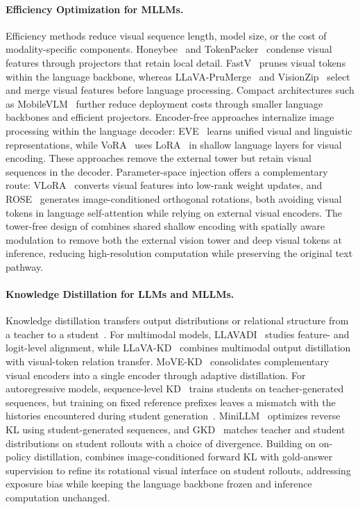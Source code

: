 \paragraph{Efficiency Optimization for MLLMs.}
Efficiency methods reduce visual sequence length, model size, or the cost
of modality-specific components. Honeybee~\citep{cha2024honeybee} and
TokenPacker~\citep{li2025tokenpacker} condense visual features through
projectors that retain local detail. FastV~\citep{chen2024fastv} prunes
visual tokens within the language backbone, whereas
LLaVA-PruMerge~\citep{shang2025prumerge} and
VisionZip~\citep{yang2025visionzip} select and merge visual features before
language processing. Compact architectures such as
MobileVLM~\citep{chu2023mobilevlm} further reduce deployment costs through
smaller language backbones and efficient projectors. Encoder-free
approaches internalize image processing within the language decoder:
EVE~\citep{diao2024eve} learns unified visual and linguistic
representations, while VoRA~\citep{vora2025} uses
LoRA~\citep{hu2021lora} in shallow language layers for visual encoding.
These approaches remove the external tower but retain visual sequences
in the decoder. Parameter-space injection offers a complementary route:
VLoRA~\citep{ma2024vlora} converts visual features into low-rank weight
updates, and ROSE~\citep{rose2025} generates image-conditioned orthogonal
rotations, both avoiding visual tokens in language self-attention while
relying on external visual encoders.
The tower-free design of \modelname{} combines shared shallow encoding
with spatially aware modulation to remove both the external vision tower and deep visual
tokens at inference, reducing high-resolution computation while
preserving the original text pathway.

\paragraph{Knowledge Distillation for LLMs and MLLMs.}
Knowledge distillation transfers output distributions or relational
structure from a teacher to a student~\citep{hinton2015distilling,park2019rkd}.
For multimodal models, LLAVADI~\citep{xu2024llavadi} studies feature- and
logit-level alignment, while LLaVA-KD~\citep{cai2025llavakd} combines
multimodal output distillation with visual-token relation transfer.
MoVE-KD~\citep{cao2025movekd} consolidates complementary visual encoders
into a single encoder through adaptive distillation. For autoregressive
models, sequence-level KD~\citep{kim2016sequence} trains students on
teacher-generated sequences, but training on fixed reference prefixes
leaves a mismatch with the histories encountered during student
generation~\citep{bengio2015scheduled,agarwal2024gkd}.
MiniLLM~\citep{gu2024minillm} optimizes reverse KL using student-generated
sequences, and GKD~\citep{agarwal2024gkd} matches teacher and student
distributions on student rollouts with a choice of divergence.
Building on on-policy distillation, \modelname{} combines image-conditioned
forward KL with gold-answer supervision to refine its rotational visual
interface on student rollouts, addressing exposure bias while keeping the
language backbone frozen and inference computation unchanged.

